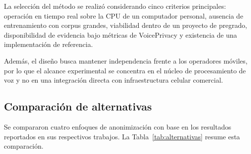 \documentclass[10pt,twocolumn]{article}
\begin{document}
La selección del método se realizó considerando cinco criterios principales:
operación en tiempo real sobre la CPU de un computador personal, ausencia de
entrenamiento con corpus grandes, viabilidad dentro de un proyecto de pregrado,
disponibilidad de evidencia bajo métricas de VoicePrivacy y existencia de una
implementación de referencia.

Además, el diseño busca mantener independencia frente a los operadores móviles,
por lo que el alcance experimental se concentra en el núcleo de procesamiento
de voz y no en una integración directa con infraestructura celular comercial.

\subsection{Comparación de alternativas}

Se compararon cuatro enfoques de anonimización con base en los resultados
reportados en sus respectivos trabajos. La Tabla~\ref{tab:alternativas} resume
esta comparación.
\end{document}
